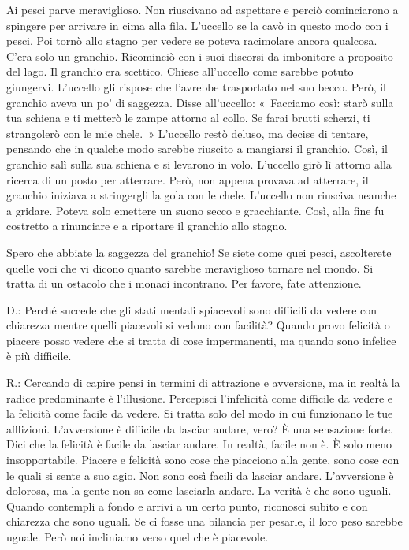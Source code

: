 Ai pesci parve meraviglioso. Non riuscivano ad aspettare e perciò
cominciarono a spingere per arrivare in cima alla fila. L'uccello se la
cavò in questo modo con i pesci. Poi tornò allo stagno per vedere se
poteva racimolare ancora qualcosa. C'era solo un granchio. Ricominciò
con i suoi discorsi da imbonitore a proposito del lago. Il granchio era
scettico. Chiese all'uccello come sarebbe potuto giungervi. L'uccello
gli rispose che l'avrebbe trasportato nel suo becco. Però, il granchio
aveva un po' di saggezza. Disse all'uccello: «~Facciamo così: starò
sulla tua schiena e ti metterò le zampe attorno al collo. Se farai
brutti scherzi, ti strangolerò con le mie chele.~» L'uccello restò
deluso, ma decise di tentare, pensando che in qualche modo sarebbe
riuscito a mangiarsi il granchio. Così, il granchio salì sulla sua
schiena e si levarono in volo. L'uccello girò lì attorno alla ricerca di
un posto per atterrare. Però, non appena provava ad atterrare, il
granchio iniziava a stringergli la gola con le chele. L'uccello non
riusciva neanche a gridare. Poteva solo emettere un suono secco e
gracchiante. Così, alla fine fu costretto a rinunciare e a riportare il
granchio allo stagno.

Spero che abbiate la saggezza del granchio! Se siete come quei pesci,
ascolterete quelle voci che vi dicono quanto sarebbe meraviglioso
tornare nel mondo. Si tratta di un ostacolo che i monaci incontrano. Per
favore, fate attenzione.

D.: Perché succede che gli stati mentali spiacevoli sono difficili da
vedere con chiarezza mentre quelli piacevoli si vedono con facilità?
Quando provo felicità o piacere posso vedere che si tratta di cose
impermanenti, ma quando sono infelice è più difficile.

R.: Cercando di capire pensi in termini di attrazione e avversione, ma
in realtà la radice predominante è l'illusione. Percepisci l'infelicità
come difficile da vedere e la felicità come facile da vedere. Si tratta
solo del modo in cui funzionano le tue afflizioni. L'avversione è
difficile da lasciar andare, vero? È una sensazione forte. Dici che la
felicità è facile da lasciar andare. In realtà, facile non è. È solo
meno insopportabile. Piacere e felicità sono cose che piacciono alla
gente, sono cose con le quali si sente a suo agio. Non sono così facili
da lasciar andare. L'avversione è dolorosa, ma la gente non sa come
lasciarla andare. La verità è che sono uguali. Quando contempli a fondo
e arrivi a un certo punto, riconosci subito e con chiarezza che sono
uguali. Se ci fosse una bilancia per pesarle, il loro peso sarebbe
uguale. Però noi incliniamo verso quel che è piacevole.

